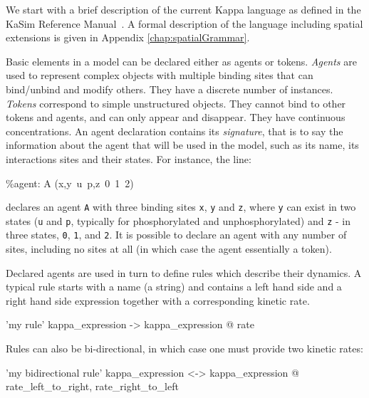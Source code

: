 \documentclass[english]{report}
\def\tbf#1{\textbf{#1}}
\begin{document}
We start with a brief description of the current Kappa language as defined in the KaSim Reference Manual~\citep{KaSimManual2012}. A formal description of the language including spatial extensions is given in Appendix \ref{chap:spatialGrammar}.

Basic elements in a model can be declared either as agents or tokens. \emph{Agents} are used to represent complex objects with multiple binding sites that can bind/unbind and modify others. They have a discrete number of instances. \emph{Tokens} correspond to simple unstructured objects. They cannot bind to other tokens and agents, and can only appear and disappear. They have continuous concentrations. An agent declaration contains its \emph{signature}, that is to say the information about the agent that will be used in the model, such as its name, its interactions sites and their states. 
%
For instance, the line:
\begin{kappasource}
\%agent: A (x,y~u~p,z~0~1~2) 
\end{kappasource}
declares an agent \Verb+A+ with three binding sites \Verb+x+, \Verb+y+ and \Verb+z+, where \Verb+y+ can exist in two states (\Verb+u+ and \Verb+p+, typically for phosphorylated and unphosphorylated) and \Verb+z+ - in three states, \Verb+0+, \Verb+1+, and \Verb+2+. It is possible to declare an agent with any number of sites, including no sites %
at all (in which case the agent essentially a token).


%
%
%

Declared agents are used in turn to define rules which describe their dynamics. A typical rule starts with a name (a string) and contains a left hand side and a right hand side expression together with a corresponding kinetic rate. 
%
%
\begin{kappasource}
'my rule' kappa_expression -> kappa_expression @ rate
\end{kappasource}

Rules can also be bi-directional, in which case one must provide two kinetic rates:
\begin{kappasource}
'my bidirectional rule' kappa_expression <-> kappa_expression @ rate_left_to_right, rate_right_to_left
\end{kappasource}
\end{document}
